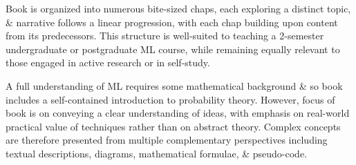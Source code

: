 \documentclass{article}
\begin{document}
Book is organized into numerous bite-sized chaps, each exploring a distinct topic, \& narrative follows a linear progression, with each chap building upon content from its predecessors. This structure is well-suited to teaching a 2-semester undergraduate or postgraduate ML course, while remaining equally relevant to those engaged in active research or in self-study.

A full understanding of ML requires some mathematical background \& so book includes a self-contained introduction to probability theory. However, focus of book is on conveying a clear understanding of ideas, with emphasis on real-world practical value of techniques rather than on abstract theory. Complex concepts are therefore presented from multiple complementary perspectives including textual descriptions, diagrams, mathematical formulae, \& pseudo-code.
\end{document}
